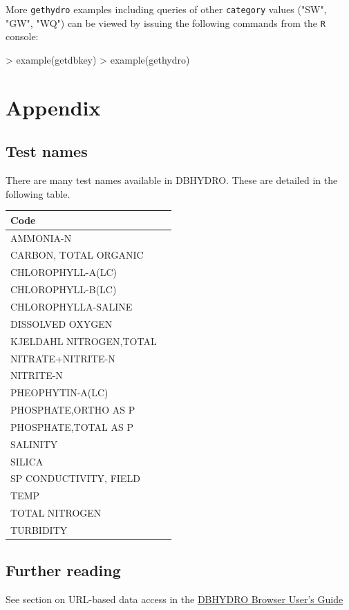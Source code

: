 \documentclass[12pt,notitlepage]{article}
\begin{document}
\noindent More \texttt{gethydro} examples including queries of other \texttt{category} values ("SW", "GW", "WQ") can be viewed by issuing the following commands from the \texttt{R} console:

\begin{Schunk}
\begin{Sinput}
> example(getdbkey)
> example(gethydro)
\end{Sinput}
\end{Schunk}

\newpage

\section{\label{sec:appendix}Appendix}
\subsection{Test names}
There are many test names available in DBHYDRO. These are detailed in the following table.\\

\begin{longtable}{| p{} | p{} |} 
\hline
Code\\
\hline
AMMONIA-N\\
CARBON, TOTAL ORGANIC\\
CHLOROPHYLL-A(LC)\\
CHLOROPHYLL-B(LC)\\
CHLOROPHYLLA-SALINE\\
DISSOLVED OXYGEN\\
KJELDAHL NITROGEN,TOTAL\\
NITRATE+NITRITE-N\\
NITRITE-N\\
PHEOPHYTIN-A(LC)\\
PHOSPHATE,ORTHO AS P\\
PHOSPHATE,TOTAL AS P\\
SALINITY\\
SILICA\\
SP CONDUCTIVITY, FIELD\\
TEMP\\
TOTAL NITROGEN\\
TURBIDITY\\
\hline
\end{longtable}

\subsection{Further reading}
See section on URL-based data access in the \href{http://www.sfwmd.gov/portal/page/portal/xrepository/sfwmd_repository_pdf/dbhydrobrowseruserdocumentation.pdf}{DBHYDRO Browser User's Guide}

\medskip
 


 
\end{document}
